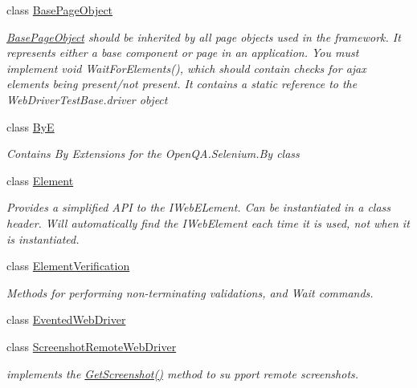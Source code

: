 \begin{DoxyCompactItemize}
\item 
class \hyperlink{class_proto_test_1_1_golem_1_1_web_driver_1_1_base_page_object}{Base\-Page\-Object}
\begin{DoxyCompactList}\small\item\em \hyperlink{class_proto_test_1_1_golem_1_1_web_driver_1_1_base_page_object}{Base\-Page\-Object} should be inherited by all page objects used in the framework. It represents either a base component or page in an application. You must implement void Wait\-For\-Elements(), which should contain checks for ajax elements being present/not present. It contains a static reference to the Web\-Driver\-Test\-Base.\-driver object \end{DoxyCompactList}\item 
class \hyperlink{class_proto_test_1_1_golem_1_1_web_driver_1_1_by_e}{By\-E}
\begin{DoxyCompactList}\small\item\em Contains By Extensions for the Open\-Q\-A.\-Selenium.\-By class \end{DoxyCompactList}\item 
class \hyperlink{class_proto_test_1_1_golem_1_1_web_driver_1_1_element}{Element}
\begin{DoxyCompactList}\small\item\em Provides a simplified A\-P\-I to the I\-Web\-E\-Lement. Can be instantiated in a class header. Will automatically find the I\-Web\-Element each time it is used, not when it is instantiated. \end{DoxyCompactList}\item 
class \hyperlink{class_proto_test_1_1_golem_1_1_web_driver_1_1_element_verification}{Element\-Verification}
\begin{DoxyCompactList}\small\item\em Methods for performing non-\/terminating validations, and Wait commands. \end{DoxyCompactList}\item 
class \hyperlink{class_proto_test_1_1_golem_1_1_web_driver_1_1_evented_web_driver}{Evented\-Web\-Driver}
\item 
class \hyperlink{class_proto_test_1_1_golem_1_1_web_driver_1_1_screenshot_remote_web_driver}{Screenshot\-Remote\-Web\-Driver}
\begin{DoxyCompactList}\small\item\em implements the \hyperlink{class_proto_test_1_1_golem_1_1_web_driver_1_1_screenshot_remote_web_driver_a2c67b3a43ba743440a0323ceae10de33}{Get\-Screenshot()} method to su pport remote screenshots. \end{DoxyCompactList}\item 

\end{DoxyCompactItemize}
